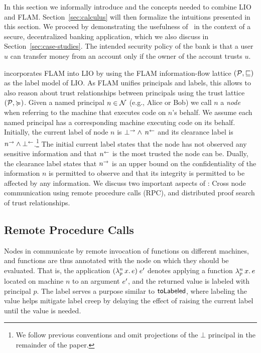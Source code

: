 In this section we informally introduce \lang{} and the concepts needed to combine LIO and FLAM. Section~\ref{sec:calculus} will then formalize the intuitions presented in this section. We proceed by demonstrating the usefulness of \lang{}\ in the context of a secure, decentralized banking application, which we also discuss in Section~\ref{sec:case-studies}. The intended security policy of the bank is that a user $u$ can transfer money from an account only if the owner of the account trusts $u$.

\lang{} incorporates FLAM into LIO by using the FLAM information-flow lattice $(\mathcal{P}, \sqsubseteq)$ as the label model of LIO. As FLAM unifies principals and labels, this allows \lang{} to also reason about trust relationships between principals using the trust lattice $(\mathcal{P}, \succcurlyeq)$.
Given a named principal $n \in \mathcal{N}$ (e.g., Alice or Bob) we call $n$ a \emph{node} when referring to the machine that executes code on $n$'s behalf. We assume each named principal has a corresponding machine executing code on its behalf. Initially, the current label of node $n$ is $\bot^{\rightarrow} \wedge\, n^{\leftarrow}$ and its clearance label is $n^{\rightarrow} \wedge \bot^{\leftarrow}$.\footnote{We follow previous conventions \cite{Arden:2015:FA:2859845.2859998} and omit projections of the $\bot$ principal in the remainder of the paper.} The initial current label states that the node has not observed any sensitive information and that $n^{\leftarrow}$ is the most trusted the node can be. Dually, the clearance label states that $n^{\rightarrow}$ is an upper bound on the confidentiality of the information $n$ is permitted to observe and that its integrity is permitted to be affected by any information. We discuss two important aspects of \lang: Cross node communication using remote procedure calls (RPC), and distributed proof search of trust relationships.

\subsection{Remote Procedure Calls}
Nodes in \lang{} communicate by remote invocation of functions on different machines, and functions are thus annotated with the node on which they should be evaluated. That is, the application $(\lambda^{n}_{p}\,x.\,e)\;e'$ denotes applying a function $\lambda^{n}_{p}\,x.\,e$ located on machine $n$ to an argument $e'$, and the returned value is labeled with principal $p$. The label serves a purpose similar to $\mathsf{toLabeled}$, where labeling the value helps mitigate label creep by delaying the effect of raising the current label until the value is needed.

